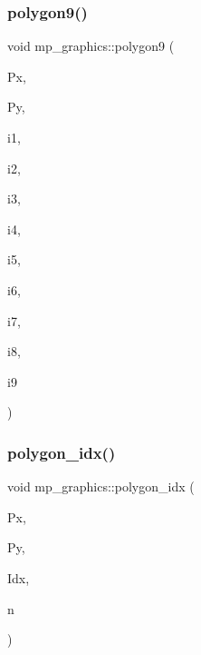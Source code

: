 \subsubsection{\texorpdfstring{polygon9()}{polygon9()}}
{\footnotesize\ttfamily void mp\+\_\+graphics\+::polygon9 (\begin{DoxyParamCaption}\item[{\mbox{\hyperlink{galois_8h_a09fddde158a3a20bd2dcadb609de11dc}{I\+NT}} $\ast$}]{Px,  }\item[{\mbox{\hyperlink{galois_8h_a09fddde158a3a20bd2dcadb609de11dc}{I\+NT}} $\ast$}]{Py,  }\item[{\mbox{\hyperlink{galois_8h_a09fddde158a3a20bd2dcadb609de11dc}{I\+NT}}}]{i1,  }\item[{\mbox{\hyperlink{galois_8h_a09fddde158a3a20bd2dcadb609de11dc}{I\+NT}}}]{i2,  }\item[{\mbox{\hyperlink{galois_8h_a09fddde158a3a20bd2dcadb609de11dc}{I\+NT}}}]{i3,  }\item[{\mbox{\hyperlink{galois_8h_a09fddde158a3a20bd2dcadb609de11dc}{I\+NT}}}]{i4,  }\item[{\mbox{\hyperlink{galois_8h_a09fddde158a3a20bd2dcadb609de11dc}{I\+NT}}}]{i5,  }\item[{\mbox{\hyperlink{galois_8h_a09fddde158a3a20bd2dcadb609de11dc}{I\+NT}}}]{i6,  }\item[{\mbox{\hyperlink{galois_8h_a09fddde158a3a20bd2dcadb609de11dc}{I\+NT}}}]{i7,  }\item[{\mbox{\hyperlink{galois_8h_a09fddde158a3a20bd2dcadb609de11dc}{I\+NT}}}]{i8,  }\item[{\mbox{\hyperlink{galois_8h_a09fddde158a3a20bd2dcadb609de11dc}{I\+NT}}}]{i9 }\end{DoxyParamCaption})}

\mbox{\label{classmp__graphics_a60729a478cad572ccb9df00b0f5988df}} 
\subsubsection{\texorpdfstring{polygon\+\_\+idx()}{polygon\_idx()}}
{\footnotesize\ttfamily void mp\+\_\+graphics\+::polygon\+\_\+idx (\begin{DoxyParamCaption}\item[{\mbox{\hyperlink{galois_8h_a09fddde158a3a20bd2dcadb609de11dc}{I\+NT}} $\ast$}]{Px,  }\item[{\mbox{\hyperlink{galois_8h_a09fddde158a3a20bd2dcadb609de11dc}{I\+NT}} $\ast$}]{Py,  }\item[{\mbox{\hyperlink{galois_8h_a09fddde158a3a20bd2dcadb609de11dc}{I\+NT}} $\ast$}]{Idx,  }\item[{\mbox{\hyperlink{galois_8h_a09fddde158a3a20bd2dcadb609de11dc}{I\+NT}}}]{n }\end{DoxyParamCaption})}

